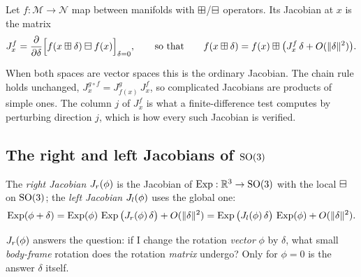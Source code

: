 \begin{definition}
\label{def:manifold-jacobian}
Let $f: \mathcal{M} \to \mathcal{N}$ map between manifolds with $\boxplus$/$\boxminus$ operators. Its
Jacobian at $x$ is the matrix
\begin{equation}
  J^f_x = \frac{\partial}{\partial\delta}\Big[ f(x\boxplus\delta) \boxminus f(x) \Big]_{\delta = 0},
  \qquad\text{so that}\qquad f(x\boxplus\delta) = f(x)\boxplus\big(J^f_x\,\delta + O(\|\delta\|^2)\big).
  \label{eq:manifold-jacobian}
\end{equation}
\end{definition}

When both spaces are vector spaces this is the ordinary Jacobian. The chain rule holds unchanged,
$J^{g\circ f}_x = J^g_{f(x)}\,J^f_x$, so complicated Jacobians are products of simple ones. The column
$j$ of $J^f_x$ is what a finite-difference test computes by perturbing direction $j$, which is how every
such Jacobian is verified.

\subsection{The right and left Jacobians of \texorpdfstring{$\mathrm{SO}(3)$}{SO(3)}}

\begin{definition}
The \emph{right Jacobian} $J_r(\phi)$ is the Jacobian of $\operatorname{Exp}: \mathbb{R}^3 \to \mathrm{SO}(3)$ with the local $\boxminus$ on
$\mathrm{SO}(3)$; the \emph{left Jacobian} $J_l(\phi)$ uses the global one:
\begin{equation}
  \operatorname{Exp}(\phi + \delta) = \operatorname{Exp}(\phi)\,\operatorname{Exp}\big(J_r(\phi)\,\delta\big) + O(\|\delta\|^2)
  = \operatorname{Exp}\big(J_l(\phi)\,\delta\big)\,\operatorname{Exp}(\phi) + O(\|\delta\|^2).
  \label{eq:jr-def}
\end{equation}
\end{definition}

$J_r(\phi)$ answers the question: if I change the rotation \emph{vector} $\phi$ by $\delta$, what small
\emph{body-frame} rotation does the rotation \emph{matrix} undergo? Only for $\phi = 0$ is the answer
$\delta$ itself.


